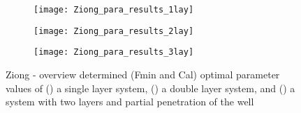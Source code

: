 \begin{figure}[h!]
	\centering
	\begin{subfigure}[b]{\linewidth}
		\centering\texttt{[image: Ziong\_para\_results\_1lay]}
		\captionsetup{justification=centering}		
		\caption{\label{fig:Ziong_para_results_1lay}}
		\end{subfigure}\vfill
	\begin{subfigure}[b]{\linewidth}
		\centering\texttt{[image: Ziong\_para\_results\_2lay]}
		\captionsetup{justification=centering}		
		\caption{\label{fig:Ziong_para_results_2lay}}
		\end{subfigure}
	\begin{subfigure}[b]{\linewidth}
		\centering\texttt{[image: Ziong\_para\_results\_3lay]}
		\captionsetup{justification=centering}		
		\caption{\label{fig:Ziong_para_results_3lay}}
		\end{subfigure}		
	\captionsetup{justification=centering}	
	\caption{Ziong - overview determined (Fmin and Cal) optimal parameter values of () a single layer system, () a double layer system, and () a system with two layers and partial penetration of the well} 
	\label{fig:Ziong_para_results}
\end{figure} 

